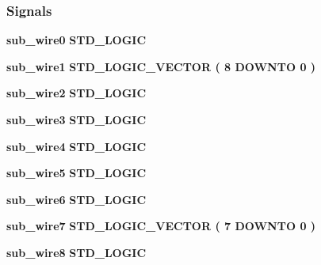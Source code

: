 \subsubsection*{Signals}
 \begin{DoxyCompactItemize}
\item 
{\bf sub\+\_\+wire0} {\bfseries \textcolor{comment}{S\+T\+D\+\_\+\+L\+O\+G\+IC}\textcolor{vhdlchar}{ }} 
\item 
{\bf sub\+\_\+wire1} {\bfseries \textcolor{comment}{S\+T\+D\+\_\+\+L\+O\+G\+I\+C\+\_\+\+V\+E\+C\+T\+OR}\textcolor{vhdlchar}{ }\textcolor{vhdlchar}{(}\textcolor{vhdlchar}{ }\textcolor{vhdlchar}{ } \textcolor{vhdldigit}{8} \textcolor{vhdlchar}{ }\textcolor{keywordflow}{D\+O\+W\+N\+TO}\textcolor{vhdlchar}{ }\textcolor{vhdlchar}{ } \textcolor{vhdldigit}{0} \textcolor{vhdlchar}{ }\textcolor{vhdlchar}{)}\textcolor{vhdlchar}{ }} 
\item 
{\bf sub\+\_\+wire2} {\bfseries \textcolor{comment}{S\+T\+D\+\_\+\+L\+O\+G\+IC}\textcolor{vhdlchar}{ }} 
\item 
{\bf sub\+\_\+wire3} {\bfseries \textcolor{comment}{S\+T\+D\+\_\+\+L\+O\+G\+IC}\textcolor{vhdlchar}{ }} 
\item 
{\bf sub\+\_\+wire4} {\bfseries \textcolor{comment}{S\+T\+D\+\_\+\+L\+O\+G\+IC}\textcolor{vhdlchar}{ }} 
\item 
{\bf sub\+\_\+wire5} {\bfseries \textcolor{comment}{S\+T\+D\+\_\+\+L\+O\+G\+IC}\textcolor{vhdlchar}{ }} 
\item 
{\bf sub\+\_\+wire6} {\bfseries \textcolor{comment}{S\+T\+D\+\_\+\+L\+O\+G\+IC}\textcolor{vhdlchar}{ }} 
\item 
{\bf sub\+\_\+wire7} {\bfseries \textcolor{comment}{S\+T\+D\+\_\+\+L\+O\+G\+I\+C\+\_\+\+V\+E\+C\+T\+OR}\textcolor{vhdlchar}{ }\textcolor{vhdlchar}{(}\textcolor{vhdlchar}{ }\textcolor{vhdlchar}{ } \textcolor{vhdldigit}{7} \textcolor{vhdlchar}{ }\textcolor{keywordflow}{D\+O\+W\+N\+TO}\textcolor{vhdlchar}{ }\textcolor{vhdlchar}{ } \textcolor{vhdldigit}{0} \textcolor{vhdlchar}{ }\textcolor{vhdlchar}{)}\textcolor{vhdlchar}{ }} 
\item 
{\bf sub\+\_\+wire8} {\bfseries \textcolor{comment}{S\+T\+D\+\_\+\+L\+O\+G\+IC}\textcolor{vhdlchar}{ }} 
\end{DoxyCompactItemize}
